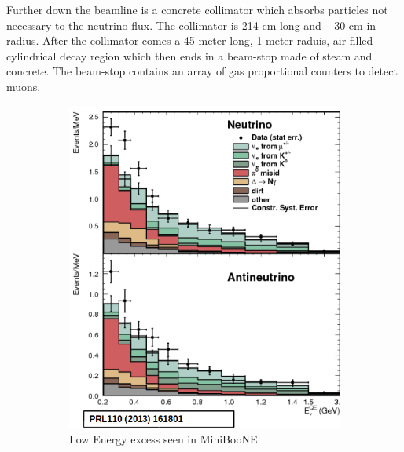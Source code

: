 Further down the beamline is a concrete collimator which absorbs particles not necessary to the neutrino flux. The collimator is 214 cm long and ~ 30 cm in radius. After the collimator comes a 45 meter long, 1 meter raduis, air-filled cylindrical decay region which then ends in a beam-stop made of steam and concrete. The beam-stop contains an array of gas proportional counters to detect muons.      





\begin{figure}[htp!]
\centering
	\begin{subfigure}[b]{.4\textwidth}
	\includegraphics[width=\textwidth]{figs/lee.png}
	\caption{Low Energy excess seen in MiniBooNE}
	\label{fig:lee}
	\end{subfigure}
	\quad
	\begin{subfigure}[b]{.4\textwidth}

\end{subfigure}
\end{figure}
